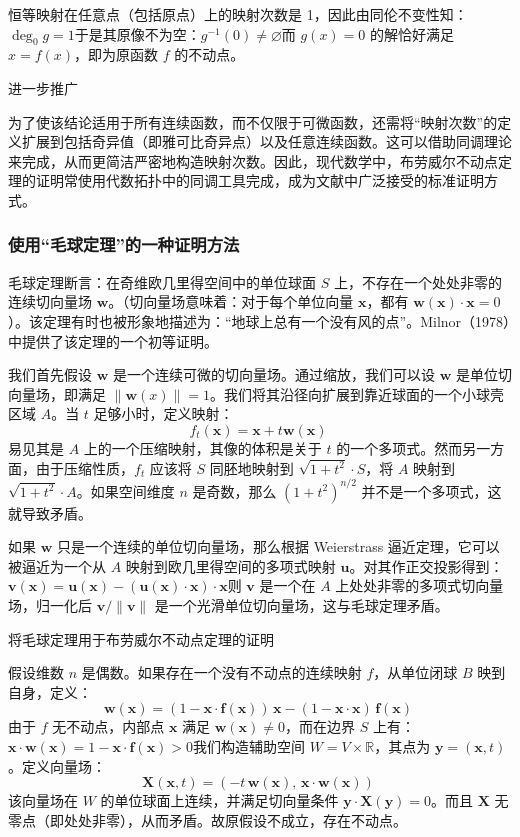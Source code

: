 恒等映射在任意点（包括原点）上的映射次数是 1，因此由同伦不变性知：$\deg_0 g = 1
$于是其原像不为空：$g^{-1}(0) \neq \varnothing$而 $g(x) = 0$ 的解恰好满足 $x = f(x)$，即为原函数 $f$ 的不动点。

进一步推广

为了使该结论适用于所有连续函数，而不仅限于可微函数，还需将“映射次数”的定义扩展到包括奇异值（即雅可比奇异点）以及任意连续函数。这可以借助同调理论来完成，从而更简洁严密地构造映射次数。因此，现代数学中，布劳威尔不动点定理的证明常使用代数拓扑中的同调工具完成，成为文献中广泛接受的标准证明方式。
\subsubsection{使用“毛球定理”的一种证明方法}
毛球定理断言：在奇维欧几里得空间中的单位球面 $S$ 上，不存在一个处处非零的连续切向量场 $\mathbf{w}$。（切向量场意味着：对于每个单位向量 $\mathbf{x}$，都有 $\mathbf{w}(\mathbf{x}) \cdot \mathbf{x} = 0$）。该定理有时也被形象地描述为：“地球上总有一个没有风的点”。Milnor（1978）中提供了该定理的一个初等证明。

我们首先假设 $\mathbf{w}$ 是一个连续可微的切向量场。通过缩放，我们可以设 $\mathbf{w}$ 是单位切向量场，即满足 $\|\mathbf{w}(x)\| = 1$。我们将其沿径向扩展到靠近球面的一个小球壳区域 $A$。当 $t$ 足够小时，定义映射：
$$
f_t(\mathbf{x}) = \mathbf{x} + t \mathbf{w}(\mathbf{x})~
$$
易见其是 $A$ 上的一个压缩映射，其像的体积是关于 $t$ 的一个多项式。然而另一方面，由于压缩性质，$f_t$ 应该将 $S$ 同胚地映射到 $\sqrt{1 + t^2} \cdot S$，将 $A$ 映射到 $\sqrt{1 + t^2} \cdot A$。如果空间维度 $n$ 是奇数，那么 $(1 + t^2)^{n/2}$ 并不是一个多项式，这就导致矛盾。

如果 $\mathbf{w}$ 只是一个连续的单位切向量场，那么根据 Weierstrass 逼近定理，它可以被逼近为一个从 $A$ 映射到欧几里得空间的多项式映射 $\mathbf{u}$。对其作正交投影得到：$\mathbf{v}(\mathbf{x}) = \mathbf{u}(\mathbf{x}) - (\mathbf{u}(\mathbf{x}) \cdot \mathbf{x}) \cdot \mathbf{x}$则 $\mathbf{v}$ 是一个在 $A$ 上处处非零的多项式切向量场，归一化后 $\mathbf{v} / \|\mathbf{v}\|$ 是一个光滑单位切向量场，这与毛球定理矛盾。

将毛球定理用于布劳威尔不动点定理的证明

假设维数 $n$ 是偶数。如果存在一个没有不动点的连续映射 $f$，从单位闭球 $B$ 映到自身，定义：
$$
\mathbf{w}(\mathbf{x}) = (1 - \mathbf{x} \cdot \mathbf{f}(\mathbf{x})) \, \mathbf{x} - (1 - \mathbf{x} \cdot \mathbf{x}) \, \mathbf{f}(\mathbf{x})~
$$
由于 $f$ 无不动点，内部点 $\mathbf{x}$ 满足 $\mathbf{w}(\mathbf{x}) \neq 0$，而在边界 $S$ 上有：$\mathbf{x} \cdot \mathbf{w}(\mathbf{x}) = 1 - \mathbf{x} \cdot \mathbf{f}(\mathbf{x}) > 0$我们构造辅助空间 $W = V \times \mathbb{R}$，其点为 $\mathbf{y} = (\mathbf{x}, t)$。定义向量场：
$$
\mathbf{X}(\mathbf{x}, t) = (-t \, \mathbf{w}(\mathbf{x}), \, \mathbf{x} \cdot \mathbf{w}(\mathbf{x}))~
$$
该向量场在 $W$ 的单位球面上连续，并满足切向量条件 $\mathbf{y} \cdot \mathbf{X}(\mathbf{y}) = 0$。而且 $\mathbf{X}$ 无零点（即处处非零），从而矛盾。故原假设不成立，存在不动点。

